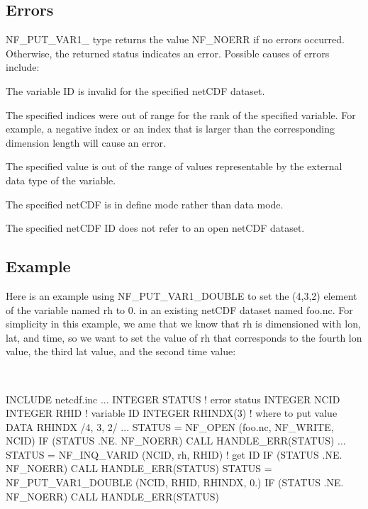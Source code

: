 \subsection*{Errors }

N\+F\+\_\+\+P\+U\+T\+\_\+\+V\+A\+R1\+\_\+ type returns the value N\+F\+\_\+\+N\+O\+E\+RR if no errors occurred. Otherwise, the returned status indicates an error. Possible causes of errors include\+:


\begin{DoxyItemize}
\item The variable ID is invalid for the specified net\+C\+DF dataset.
\item The specified indices were out of range for the rank of the specified variable. For example, a negative index or an index that is larger than the corresponding dimension length will cause an error.
\item The specified value is out of the range of values representable by the external data type of the variable.
\item The specified net\+C\+DF is in define mode rather than data mode.
\item The specified net\+C\+DF ID does not refer to an open net\+C\+DF dataset.
\end{DoxyItemize}

\subsection*{Example }

Here is an example using N\+F\+\_\+\+P\+U\+T\+\_\+\+V\+A\+R1\+\_\+\+D\+O\+U\+B\+LE to set the (4,3,2) element of the variable named rh to 0. in an existing net\+C\+DF dataset named foo.\+nc. For simplicity in this example, we ame that we know that rh is dimensioned with lon, lat, and time, so we want to set the value of rh that corresponds to the fourth lon value, the third lat value, and the second time value\+:

 

I\+N\+C\+L\+U\+DE \textquotesingle{}netcdf.\+inc\textquotesingle{} ... I\+N\+T\+E\+G\+ER S\+T\+A\+T\+US ! error status I\+N\+T\+E\+G\+ER N\+C\+ID I\+N\+T\+E\+G\+ER R\+H\+ID ! variable ID I\+N\+T\+E\+G\+ER R\+H\+I\+N\+D\+X(3) ! where to put value D\+A\+TA R\+H\+I\+N\+DX /4, 3, 2/ ... S\+T\+A\+T\+US = N\+F\+\_\+\+O\+P\+EN (\textquotesingle{}foo.\+nc\textquotesingle{}, N\+F\+\_\+\+W\+R\+I\+TE, N\+C\+ID) IF (S\+T\+A\+T\+US .NE. N\+F\+\_\+\+N\+O\+E\+RR) C\+A\+LL H\+A\+N\+D\+L\+E\+\_\+\+E\+R\+R(\+S\+T\+A\+T\+U\+S) ... S\+T\+A\+T\+US = N\+F\+\_\+\+I\+N\+Q\+\_\+\+V\+A\+R\+ID (N\+C\+ID, \textquotesingle{}rh\textquotesingle{}, R\+H\+ID) ! get ID IF (S\+T\+A\+T\+US .NE. N\+F\+\_\+\+N\+O\+E\+RR) C\+A\+LL H\+A\+N\+D\+L\+E\+\_\+\+E\+R\+R(\+S\+T\+A\+T\+U\+S) S\+T\+A\+T\+US = N\+F\+\_\+\+P\+U\+T\+\_\+\+V\+A\+R1\+\_\+\+D\+O\+U\+B\+LE (N\+C\+ID, R\+H\+ID, R\+H\+I\+N\+DX, 0.) IF (S\+T\+A\+T\+US .NE. N\+F\+\_\+\+N\+O\+E\+RR) C\+A\+LL H\+A\+N\+D\+L\+E\+\_\+\+E\+R\+R(\+S\+T\+A\+T\+U\+S)

